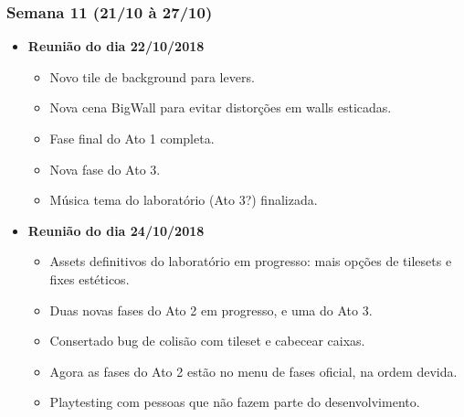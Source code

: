 \documentclass[a4paper, 11pt]{article}
\begin{document}
\subsubsection{Semana 11 (21/10 à 27/10)}
	\begin{itemize} 
		\item \textbf{Reunião do dia 22/10/2018}

		\begin{itemize}

    		\item Novo tile de background para levers.
    		\item Nova cena BigWall para evitar distorções em walls esticadas.
    		\item Fase final do Ato 1 completa.
    		\item Nova fase do Ato 3.
    		\item Música tema do laboratório (Ato 3?) finalizada.

   		\end{itemize}

		\item \textbf{Reunião do dia 24/10/2018}

		\begin{itemize}

    		\item Assets definitivos do laboratório em progresso: mais opções de tilesets e fixes estéticos.
    		\item Duas novas fases do Ato 2 em progresso, e uma do Ato 3.
    		\item Consertado bug de colisão com tileset e cabecear caixas.
    		\item Agora as fases do Ato 2 estão no menu de fases oficial, na ordem devida.
    		\item Playtesting com pessoas que não fazem parte do desenvolvimento.

		\end{itemize}

	\end{itemize}
\end{document}
